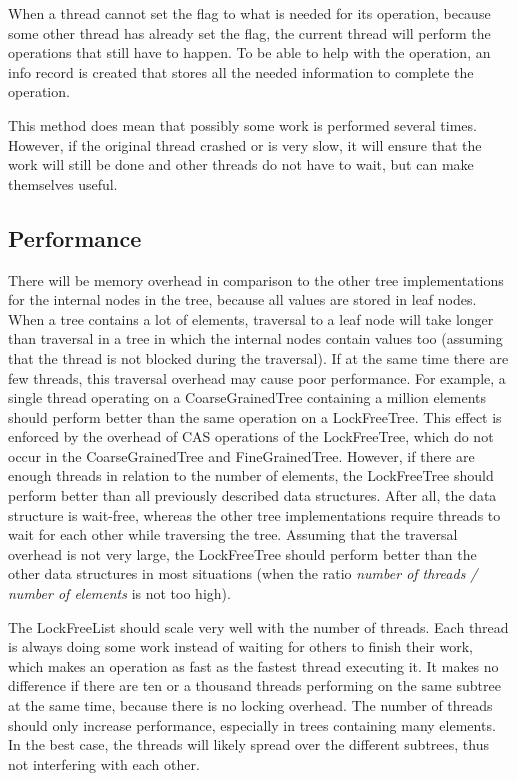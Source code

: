 \documentclass[a4paper]{article}
\begin{document}
When a thread cannot set the flag to what is needed for its operation, because some other
thread has already set the flag, the current thread will perform the operations that still
have to happen. To be able to help with the operation, an info record is created that 
stores all the needed information to complete the operation.

This method does mean that possibly some work is performed several times. However, if
the original thread crashed or is very slow, it will ensure that the work will still be
done and other threads do not have to wait, but can make themselves useful.

\subsection{Performance}

There will be memory overhead in comparison to the other tree implementations for the
internal nodes in the tree, because all values are stored in leaf nodes. When a tree
contains a lot of elements, traversal to a leaf node will take longer than traversal in a
tree in which the internal nodes contain values too (assuming that the thread is not
blocked during the traversal). If at the same time there are few threads, this traversal
overhead may cause poor performance. For example, a single thread operating on a
CoarseGrainedTree containing a million elements should perform better than the same
operation on a LockFreeTree. This effect is enforced by the overhead of CAS operations of
the LockFreeTree, which do not occur in the CoarseGrainedTree and FineGrainedTree.
However, if there are enough threads in relation to the number of elements, the
LockFreeTree should perform better than all previously described data structures. After
all, the data structure is wait-free, whereas the other tree implementations require
threads to wait for each other while traversing the tree. Assuming that the traversal
overhead is not very large, the LockFreeTree should perform better than the other data
structures in most situations (when the ratio \emph{number of threads / number of
elements} is not too high).

The LockFreeList should scale very well with the number of threads. Each thread is always doing some work instead of waiting for others to finish their work, which makes an operation as fast as the fastest thread executing it. It makes no difference if there are ten or a thousand threads performing on the same subtree at the same time, because there is no locking overhead. The number of threads should only increase performance, especially in trees containing many elements. In the best case, the threads will likely spread over the different subtrees, thus not interfering with each other.
\end{document}
